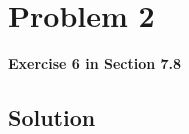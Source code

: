 
\begingroup
\allowdisplaybreaks

\newpage
\section{Problem 2}

\textbf{Exercise 6 in Section 7.8}

\subsection{Solution}